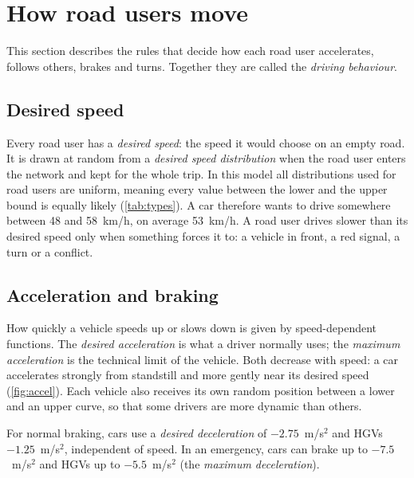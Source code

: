 \documentclass[11pt,a4paper]{article}
\newcommand{\kmh}{~km/h}
\begin{document}
\section{How road users move}
\label{sec:behaviour}

This section describes the rules that decide how each road user accelerates, follows others,
brakes and turns. Together they are called the \emph{driving behaviour}.

\subsection{Desired speed}

Every road user has a \emph{desired speed}: the speed it would choose on an empty road. It is drawn
at random from a \emph{desired speed distribution} when the road user enters the network and kept
for the whole trip. In this model all distributions used for road users are uniform, meaning
every value between the lower and the upper bound is equally likely (\cref{tab:types}). A car
therefore wants to drive somewhere between 48 and 58\kmh, on average 53\kmh. A road user drives
slower than its desired speed only when something forces it to: a vehicle in front, a red signal,
a turn or a conflict.

\subsection{Acceleration and braking}

How quickly a vehicle speeds up or slows down is given by speed-dependent functions. The
\emph{desired acceleration} is what a driver normally uses; the \emph{maximum acceleration} is the
technical limit of the vehicle. Both decrease with speed: a car accelerates strongly from standstill
and more gently near its desired speed (\cref{fig:accel}). Each vehicle also receives its own
random position between a lower and an upper curve, so that some drivers are more dynamic than
others.

For normal braking, cars use a \emph{desired deceleration} of $-2.75$~m/s$^2$ and HGVs
$-1.25$~m/s$^2$, independent of speed. In an emergency, cars can brake up to $-7.5$~m/s$^2$ and
HGVs up to $-5.5$~m/s$^2$ (the \emph{maximum deceleration}).
\end{document}
